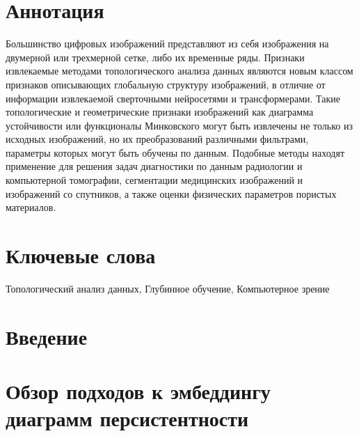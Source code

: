 \documentclass[a4paper,12pt]{extarticle}
\theoremstyle{definition}
\theoremstyle{examples}
\begin{document}
\newpage
\setcounter{page}{2}

{
	\hypersetup{linkcolor=black}
	\tableofcontents
}

\newpage

\newpage
\section*{Аннотация}
Большинство цифровых изображений представляют из себя изображения на двумерной или трехмерной сетке, либо их временные ряды. Признаки извлекаемые методами топологического анализа данных являются новым классом признаков описывающих глобальную структуру изображений, в отличие от информации извлекаемой сверточными нейросетями и трансформерами. Такие топологические и геометрические признаки изображений как диаграмма устойчивости или функционалы Минковского могут быть извлечены не только из исходных изображений, но их преобразований различными фильтрами, параметры которых могут быть обучены по данным. Подобные методы находят применение для решения задач диагностики по данным радиологии и компьютерной томографии, сегментации медицинских изображений и изображений со спутников, а также оценки физических параметров пористых материалов.


\section*{Ключевые слова}
Топологический анализ данных, Глубинное обучение, Компьютерное зрение
\pagebreak

\section{Введение}
\begin{sloppypar}
    
    \hspace{1cm}
\end{sloppypar}

\section{Обзор подходов к эмбеддингу диаграмм персистентности}
\label{sec:related-work}
\begin{sloppypar}
    
    \hspace{1cm}
\end{sloppypar}
\end{document}
